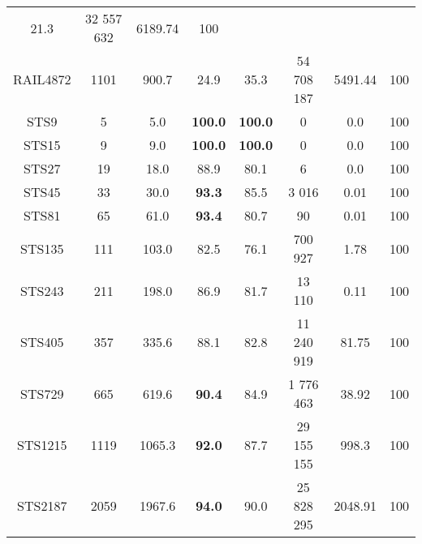 \begin{longtable}{@{\extracolsep{5pt}}cccccccc}
	21.3
	&
	32 557 632
	&
	6189.74
	&
	100
	\\
	RAIL4872
	&
	1101
	&
	900.7
	&
	24.9
	&
	35.3
	&
	54 708 187
	&
	5491.44
	&
	100
	\\
	STS9
	&
	5
	&
	5.0
	&
	\textbf{100.0}
	&
	\textbf{100.0}
	&
	0
	&
	0.0
	&
	100
	\\
	STS15
	&
	9
	&
	9.0
	&
	\textbf{100.0}
	&
	\textbf{100.0}
	&
	0
	&
	0.0
	&
	100
	\\
	STS27
	&
	19
	&
	18.0
	&
	88.9
	&
	80.1
	&
	6
	&
	0.0
	&
	100
	\\
	STS45
	&
	33
	&
	30.0
	&
	\textbf{93.3}
	&
	85.5
	&
	3 016
	&
	0.01
	&
	100
	\\
	STS81
	&
	65
	&
	61.0
	&
	\textbf{93.4}
	&
	80.7
	&
	90
	&
	0.01
	&
	100
	\\
	STS135
	&
	111
	&
	103.0
	&
	82.5
	&
	76.1
	&
	700 927
	&
	1.78
	&
	100
	\\
	STS243
	&
	211
	&
	198.0
	&
	86.9
	&
	81.7
	&
	13 110
	&
	0.11
	&
	100
	\\
	STS405
	&
	357
	&
	335.6
	&
	88.1
	&
	82.8
	&
	11 240 919
	&
	81.75
	&
	100
	\\
	STS729
	&
	665
	&
	619.6
	&
	\textbf{90.4}
	&
	84.9
	&
	1 776 463
	&
	38.92
	&
	100
	\\
	STS1215
	&
	1119
	&
	1065.3
	&
	\textbf{92.0}
	&
	87.7
	&
	29 155 155
	&
	998.3
	&
	100
	\\
	STS2187
	&
	2059
	&
	1967.6
	&
	\textbf{94.0}
	&
	90.0
	&
	25 828 295
	&
	2048.91
	&
	100
	\\
\end{longtable}
